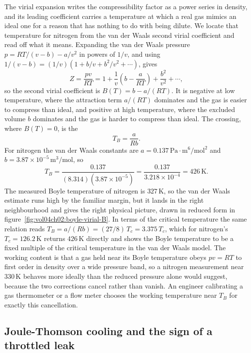 The virial expansion writes the compressibility factor as a power series in
density, and its leading coefficient carries a temperature at which a real
gas mimics an ideal one for a reason that has nothing to do with being
dilute. We locate that temperature for nitrogen from the van der Waals second
virial coefficient and read off what it means. Expanding the van der Waals
pressure $p = RT/(v-b) - a/v^2$ in powers of $1/v$, and using $1/(v-b) =
(1/v)(1 + b/v + b^2/v^2 + \cdots)$, gives
\[
Z = \frac{pv}{RT} = 1 + \frac{1}{v}\left(b - \frac{a}{RT}\right) +
\frac{b^2}{v^2} + \cdots,
\]
so the second virial coefficient is $B(T) = b - a/(RT)$. It is negative at
low temperature, where the attraction term $a/(RT)$ dominates and the gas is
easier to compress than ideal, and positive at high temperature, where the
excluded volume $b$ dominates and the gas is harder to compress than ideal.
The crossing, where $B(T) = 0$, is the 
\[
T_B = \frac{a}{Rb}.
\]
For nitrogen the van der Waals constants are $a = 0.137\,\text{Pa}\cdot
\text{m}^6/\text{mol}^2$ and $b = 3.87\times 10^{-5}\,\text{m}^3/\text{mol}$,
so
\[
T_B = \frac{0.137}{(8.314)(3.87\times 10^{-5})} = \frac{0.137}{3.218\times
10^{-4}} = 426\,\si{\kelvin}.
\]
The measured Boyle temperature of nitrogen is $327\,\si{\kelvin}$, so the van
der Waals estimate runs high by the familiar margin, but it lands in the
right neighbourhood and gives the right physical picture, drawn in reduced
form in figure~\ref{fig:vol04ch02:boyle-virial-B}. In terms of the critical
temperature the same relation reads $T_B = a/(Rb) = (27/8)\,T_c = 3.375\,T_c$,
which for nitrogen's $T_c = 126.2\,\si{\kelvin}$ returns $426\,\si{\kelvin}$
directly and shows the Boyle temperature to be a fixed multiple of the
critical temperature in the van der Waals model. The working content is that
a gas held near its Boyle temperature obeys $pv = RT$ to first order in
density over a wide pressure band, so a nitrogen measurement near
$330\,\si{\kelvin}$ behaves more ideally than the reduced pressure alone
would suggest, because the two corrections cancel rather than vanish. An
engineer calibrating a gas thermometer or a flow meter chooses the working
temperature near $T_B$ for exactly this cancellation.



\subsection{Joule-Thomson cooling and the sign of a throttled leak}

